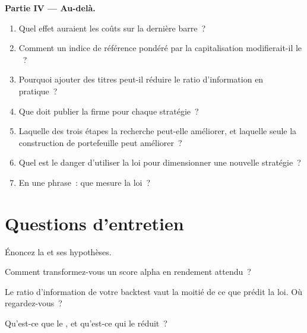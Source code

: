 \begin{problem}
\medskip\noindent\textbf{Partie IV --- Au-delà.}
\begin{enumerate}[resume]
\item Quel effet auraient les coûts sur la dernière barre~?
\item Comment un indice de référence pondéré par la capitalisation modifierait-il le ~?
\item Pourquoi ajouter des titres peut-il réduire le ratio d'information en pratique~?
\item Que doit publier la firme pour chaque stratégie~?
\item Laquelle des trois étapes la recherche peut-elle améliorer, et laquelle seule la construction de portefeuille peut améliorer~?
\item Quel est le danger d'utiliser la loi pour dimensionner une nouvelle stratégie~?
\item En une phrase~: que mesure la loi~?
\end{enumerate}
\end{problem}

\section{Questions d'entretien}

\begin{interviewq}\label{iq:rs:from-signal-to-forecast:1}
Énoncez la  et ses hypothèses.
\end{interviewq}

\begin{interviewq}\label{iq:rs:from-signal-to-forecast:2}
Comment transformez-vous un score alpha en rendement attendu~?
\end{interviewq}

\begin{interviewq}\label{iq:rs:from-signal-to-forecast:3}
Le ratio d'information de votre backtest vaut la moitié de ce que prédit la loi. Où regardez-vous~?
\end{interviewq}

\begin{interviewq}\label{iq:rs:from-signal-to-forecast:4}
Qu'est-ce que le , et qu'est-ce qui le réduit~?
\end{interviewq}

